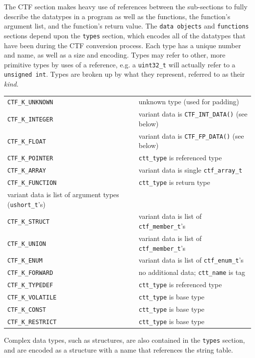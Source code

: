 The CTF section makes heavy use of references between the sub-sections
to fully describe the datatypes in a program as well as the functions,
the function's argument list, and the function's return value.  The
\verb|data objects| and \verb|functions| sections depend upon the
\verb|types| section, which encodes all of the datatypes that have
been during the CTF conversion process.  Each type has a unique number
and name, as well as a size and encoding.  Types may refer to other,
more primitive types by uses of a reference, e.g. a \verb|uint32_t|
will actually refer to a \verb|unsigned int|.  Types are broken up by
what they represent, referred to as their \emph{kind}.

\begin{tabular}{|l|l}
\hline
\verb|CTF_K_UNKNOWN|    & unknown type (used for padding) \\
\verb|CTF_K_INTEGER|    & variant data is \verb|CTF_INT_DATA()| (see below)\\
\verb|CTF_K_FLOAT|      & variant data is \verb|CTF_FP_DATA()| (see below)\\
\verb|CTF_K_POINTER|    & \verb|ctt_type| is referenced type\\
\verb|CTF_K_ARRAY|      & variant data is single \verb|ctf_array_t|\\
  \verb|CTF_K_FUNCTION| & \verb|ctt_type| is return type\\
  variant data is list of argument types (\verb|ushort_t|'s)\\
\verb|CTF_K_STRUCT|     & variant data is list of \verb|ctf_member_t|'s\\
\verb|CTF_K_UNION|      & variant data is list of \verb|ctf_member_t|'s\\
\verb|CTF_K_ENUM|       & variant data is list of \verb|ctf_enum_t|'s\\
\verb|CTF_K_FORWARD|    & no additional data; \verb|ctt_name| is tag\\
\verb|CTF_K_TYPEDEF|    & \verb|ctt_type| is referenced type\\
\verb|CTF_K_VOLATILE|   & \verb|ctt_type| is base type\\
\verb|CTF_K_CONST|      & \verb|ctt_type| is base type\\
\verb|CTF_K_RESTRICT|   & \verb|ctt_type| is base type\\
\hline
\end{tabular}

Complex data types, such as structures, are also contained in the
\verb|types| section, and are encoded as a structure with a name that
references the string table.


